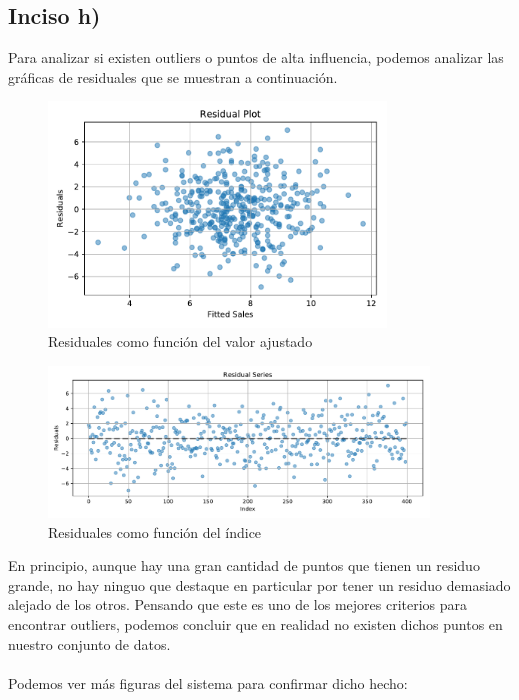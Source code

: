 \documentclass[11pt]{article}
\begin{document}
\subsection{Inciso h)}
Para analizar si existen outliers o puntos de alta influencia, podemos analizar las gráficas de residuales que se muestran a continuación.
\begin{figure}[H]
    \centering
    \includegraphics[width = 0.80\textwidth]{1-resplot.pdf}
    \caption{Residuales como función del valor ajustado}
    \label{fig:1-resplot}
\end{figure}
\begin{figure}[H]
    \centering
    \includegraphics[width = 0.9\textwidth]{1-restimeplot.pdf}
    \caption{Residuales como función del índice}
    \label{fig:1-restimeplot}
\end{figure}
En principio, aunque hay una gran cantidad de puntos que tienen un residuo grande, no hay ninguo que destaque en particular por tener un residuo demasiado alejado de los otros. Pensando que este es uno de los mejores criterios para encontrar outliers, podemos concluir que en realidad no existen dichos puntos en nuestro conjunto de datos.
\\
\\Podemos ver más figuras del sistema para confirmar dicho hecho:
\end{document}
